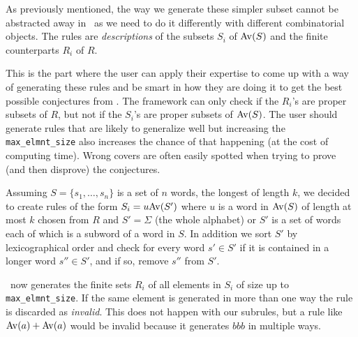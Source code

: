 As previously mentioned, the way we generate these simpler subset cannot be 
abstracted away in \CombCov\ as we need to do it differently with different 
combinatorial objects. The rules are \emph{descriptions} of the subsets $S_i$ 
of ${\mathrm{Av}\!\left(S\right)}$ and the finite counterparts $R_i$ of $R$.

This is the part where the user can apply their expertise to come up with a way 
of generating these rules and be  smart in how they are doing it to get the best 
possible conjectures from \CombCov. The framework can only check if the $R_i$'s 
are proper subsets of $R$, but not if the $S_i$'s are proper subsets of 
${\mathrm{Av}\!\left(S\right)}$. The user should generate rules that are likely to generalize well but 
increasing the \texttt{max\_elmnt\_size} also increases the chance of that 
happening (at the cost of computing time). Wrong covers are often easily spotted 
when trying to prove (and then disprove) the conjectures.

Assuming $S = \{ s_1, \ldots, s_n \}$ is a set of $n$ words, the longest of 
length $k$, we decided to create rules of the form $S_i = u {\mathrm{Av}\!\left(S'\right)}$ where $u$ 
is a word in ${\mathrm{Av}\!\left(S\right)}$ of length at most $k$ chosen from $R$ and $S' = \Sigma$ 
(the whole alphabet) or $S'$ is a set of words each of which is a subword of a 
word in $S$. In addition we sort $S'$ by lexicographical order and check for 
every word $s' \in S'$ if it is contained in a longer word $s'' \in S'$, and if 
so, remove $s''$ from $S'$.



\CombCov\ now generates the finite sets $R_i$ of all elements in $S_i$ of size 
up to \texttt{max\_elmnt\_size}. If the same element is generated in more than 
one way the rule is discarded as \emph{invalid}. This does not happen with our 
subrules, but a rule like ${\mathrm{Av}\!\left(a\right)} + {\mathrm{Av}\!\left(a\right)}$ would be invalid because it 
generates $bbb$ in multiple ways.

